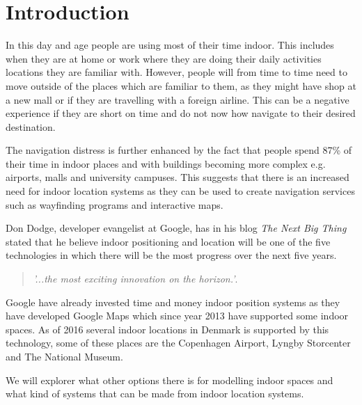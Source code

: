 \chapter{Introduction}
In this day and age people are using most of their time indoor. This includes when they are at home or work where they are doing their daily activities  locations they are familiar with. However, people will from time to time need to move outside of the places which are familiar to them, as they might have shop at a new mall or if they are travelling with a foreign airline. This can be a negative experience if they are short on time and do not now how navigate to their desired destination. 

The navigation distress is further enhanced by the fact that people spend 87\% of their time in indoor places and with buildings becoming more complex e.g. airports, malls and university campuses. This suggests that there is an increased need for indoor location systems as they can be used to create navigation services such as wayfinding programs and interactive maps. %

Don Dodge, developer evangelist at Google, has in his blog \textit{The Next Big Thing} stated that he believe indoor positioning and location will be one of the five technologies in which there will be the most progress over the next five years\cite{DonDIndoorIsNext}.
\begin{quotation}
	\textit{'...the most exciting innovation on the horizon.'}\cite{DonDNextBigThing}.
\end{quotation}
Google have already invested time and money indoor position systems as they have developed Google Maps which since year 2013 have supported some indoor spaces\cite{google_indoor}. As of 2016 several indoor locations in Denmark is supported by this technology, some of these places are the Copenhagen Airport, Lyngby Storcenter and The National Museum\cite{google_dk}.

We will explorer what other options there is for modelling indoor spaces and what kind of systems that can be made from indoor location systems.
